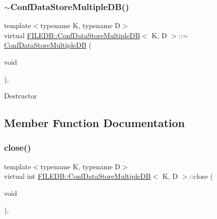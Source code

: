 \subsubsection{\texorpdfstring{$\sim$ConfDataStoreMultipleDB()}{~ConfDataStoreMultipleDB()}\hspace{0.1cm}{\footnotesize\ttfamily [3/3]}}
{\footnotesize\ttfamily template$<$typename K, typename D$>$ \\
virtual \mbox{\hyperlink{classFILEDB_1_1ConfDataStoreMultipleDB}{F\+I\+L\+E\+D\+B\+::\+Conf\+Data\+Store\+Multiple\+DB}}$<$ K, D $>$\+::$\sim$\mbox{\hyperlink{classFILEDB_1_1ConfDataStoreMultipleDB}{Conf\+Data\+Store\+Multiple\+DB}} (\begin{DoxyParamCaption}\item[{void}]{ }\end{DoxyParamCaption})\hspace{0.3cm}{\ttfamily [inline]}, {\ttfamily [virtual]}}

Destructor 

\subsection{Member Function Documentation}
\mbox{\label{classFILEDB_1_1ConfDataStoreMultipleDB_a6ab94d980290baa33292b7ec54bfe637}} 
\subsubsection{\texorpdfstring{close()}{close()}\hspace{0.1cm}{\footnotesize\ttfamily [1/3]}}
{\footnotesize\ttfamily template$<$typename K, typename D$>$ \\
virtual int \mbox{\hyperlink{classFILEDB_1_1ConfDataStoreMultipleDB}{F\+I\+L\+E\+D\+B\+::\+Conf\+Data\+Store\+Multiple\+DB}}$<$ K, D $>$\+::close (\begin{DoxyParamCaption}\item[{void}]{ }\end{DoxyParamCaption})\hspace{0.3cm}{\ttfamily [inline]}, {\ttfamily [virtual]}}

\mbox{\label{classFILEDB_1_1ConfDataStoreMultipleDB_a6ab94d980290baa33292b7ec54bfe637}} 
